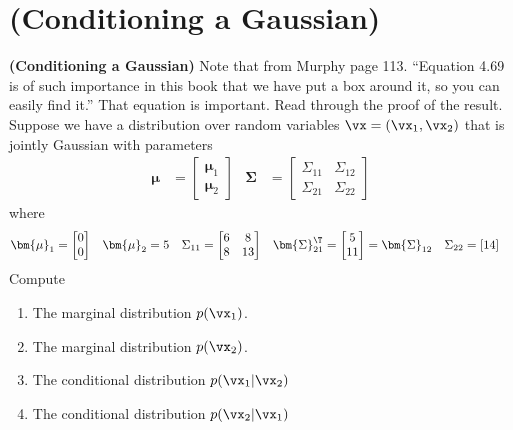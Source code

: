 \documentclass[189]{pset}
\begin{document}

  \section{(Conditioning a Gaussian)}
    \textbf{(Conditioning a Gaussian)} Note that from Murphy page 113.
    ``Equation 4.69 is of such importance in this book that we have
    put a box around it, so you can easily find it.'' That equation is
    important. Read through the proof of the result. Suppose we have a
    distribution over random variables $\vx = (\vx_1, \vx_2)$ that is
    jointly Gaussian with parameters
    \begin{align*}
      \bm{\mu}
      &=
        \begin{bmatrix}
          \bm{\mu}_1 \\
          \bm{\mu}_2
        \end{bmatrix}
      & \bm{\Sigma}
      &=
        \begin{bmatrix}
          \Sigma_{11} & \Sigma_{12} \\
          \Sigma_{21} & \Sigma_{22}
        \end{bmatrix}
    \end{align*}
    where
    \begin{align*}
      \bm{\mu}_1
      &=
        \begin{bmatrix}
          0\\
          0
        \end{bmatrix}
      & \bm{\mu}_2
      &= 5
      & \Sigma_{11}
      &=
        \begin{bmatrix}
          6 & 8 \\
          8 & 13
        \end{bmatrix}
      & \bm{\Sigma}_{21}^\T
      &=
        \begin{bmatrix}
          5 \\
          11
        \end{bmatrix} = \bm{\Sigma}_{12}
      & \Sigma_{22}
      &= [14]
    \end{align*}
    Compute
    \begin{enumerate}
      \item The marginal distribution $p(\vx_1)$.
      \item The marginal distribution $p(\vx_2)$.
      \item The conditional distribution $p(\vx_1 | \vx_2)$
      \item The conditional distribution $p(\vx_2 | \vx_1)$
    \end{enumerate}
\end{document}
